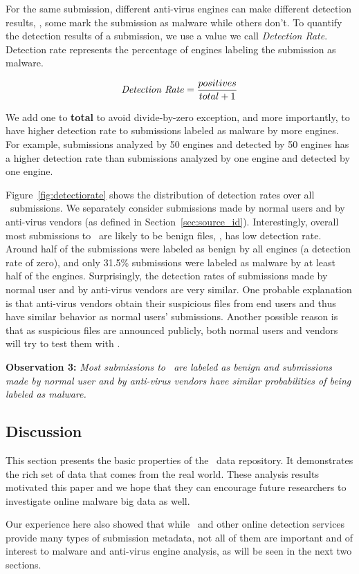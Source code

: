 For the same submission, different anti-virus engines can make different detection results, \ie, 
some mark the submission as malware while others don't.
To quantify the detection results of a submission,
we use a value we call {\em Detection Rate}.
Detection rate represents the percentage of engines labeling the submission as malware. 

$$ \textrm{\textit{Detection Rate}} = \dfrac{positives}{total + 1}$$

We add one to {\bf total} to avoid divide-by-zero exception, and more importantly, 
to have higher detection rate to submissions labeled as malware by more engines.
For example, submissions analyzed by 50 engines and detected by 50 engines 
has a higher detection rate 
than submissions analyzed by one engine and detected by one engine. 

Figure~\ref{fig:detectiorate} shows the distribution of detection rates over all \pe\ submissions.
We separately consider submissions made by normal users and by anti-virus vendors 
(as defined in Section~\ref{sec:source_id}).
Interestingly, overall most submissions to \vt\ are likely to be benign files, \ie, has low detection rate.
Around half of the submissions were labeled as benign by all engines (a detection rate of zero),
and only 31.5\% submissions were labeled as malware by at least half of the engines.
Surprisingly, the detection rates of submissions made by normal user and by anti-virus vendors are very similar.
One probable explanation is that anti-virus vendors obtain their suspicious files 
from end users and thus have similar behavior as normal users' submissions.
Another possible reason is that as suspicious files are announced publicly, 
both normal users and vendors will try to test them with \vt.



{\bf Observation 3:} 
{\em Most submissions to \vt\ are labeled as benign and 
submissions made by normal user and by anti-virus vendors have similar probabilities of being labeled as malware.}


\subsection{Discussion}
This section presents the basic properties of the \vt\ data repository.
It demonstrates the rich set of data that comes from the real world.
These analysis results motivated this paper and we 
hope that they can encourage future researchers to investigate online malware big data as well.

Our experience here also showed that while \vt\ and other online detection services provide many types of submission metadata, not all of them are important and of interest to malware and anti-virus engine analysis, as will be seen in the next two sections. 